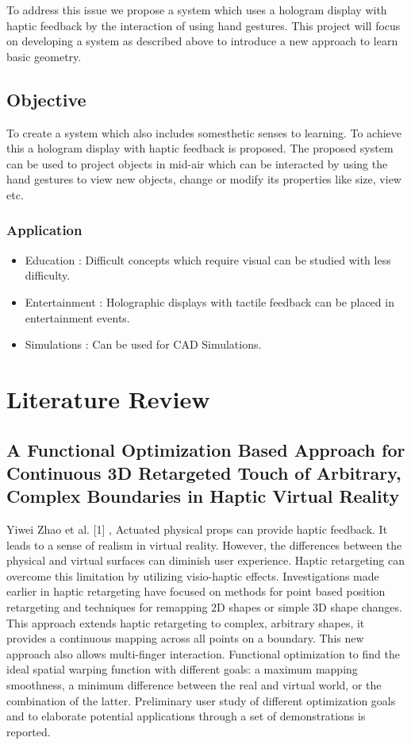 \documentclass{fisatproject}
\begin{document}
\par To address this issue  we propose a system which uses a hologram display with haptic feedback by the interaction of using hand gestures. This project will focus on developing a system as described above to introduce a new approach to learn basic geometry.

\section{Objective}

To create a system which also includes somesthetic senses to learning. To achieve this a hologram display with haptic feedback is proposed. The proposed system can be used to project objects in mid-air which can be interacted by using the hand gestures to view new objects, change or modify its properties like size, view etc.
\subsection{Application}
\begin{itemize}
    \item  Education : Difficult concepts which require visual can be studied with less difficulty. 
    \item  Entertainment : Holographic displays with tactile feedback can be placed in entertainment events.
    \item  Simulations : Can be used for CAD Simulations.
\end{itemize}
\chapter{Literature Review}
\section{ 
    A Functional Optimization Based Approach for Continuous 3D Retargeted Touch of Arbitrary, Complex Boundaries in Haptic Virtual Reality
}
\par Yiwei Zhao et al. [1] ,
Actuated physical props can provide haptic feedback. It leads to a sense of realism in virtual reality. However, the differences between the physical and virtual surfaces can diminish user experience. Haptic retargeting can overcome this limitation by utilizing visio-haptic effects. Investigations made earlier in haptic retargeting have focused on methods for point based position retargeting and techniques for remapping 2D shapes or simple 3D shape changes. This approach extends haptic retargeting to complex, arbitrary shapes, it provides a continuous mapping across all points on a boundary. This new approach also allows multi-finger interaction.  Functional optimization to find the ideal spatial warping function with different goals: a maximum mapping smoothness, a minimum difference between the real and virtual world, or the combination of the latter.  Preliminary user study of different optimization goals and to elaborate potential applications through a set of demonstrations is reported.
\end{document}
